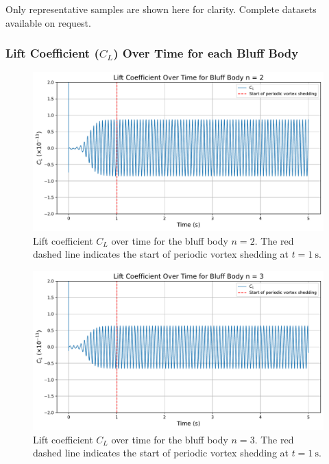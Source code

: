 \begin{tcolorbox}[width=\textwidth, height=2.3cm, colframe=black, boxrule=0.5pt, sharp corners]
	\vspace{0.6em}
	Only representative samples are shown here for clarity. Complete datasets available on request. 
\end{tcolorbox}

\subsubsection{Lift Coefficient ($C_L$) Over Time for each Bluff Body}
\label{sec:C_LvsTime}

\begin{figure}[H]
	\centering
	\includegraphics[width=\textwidth]{images/2face_graph}
	\caption{Lift coefficient $C_L$ over time for the bluff body $n=2$. The red dashed line indicates the start of periodic vortex shedding at $t = \SI{1}{\second}$.}
	\label{fig:2FaceGraph}
\end{figure}

\begin{figure}[H]
	\centering
	\includegraphics[width=\textwidth]{images/3face_graph}
	\caption{Lift coefficient $C_L$ over time for the bluff body $n=3$. The red dashed line indicates the start of periodic vortex shedding at $t = \SI{1}{\second}$.}
	\label{fig:3FaceGraph} 
\end{figure}

